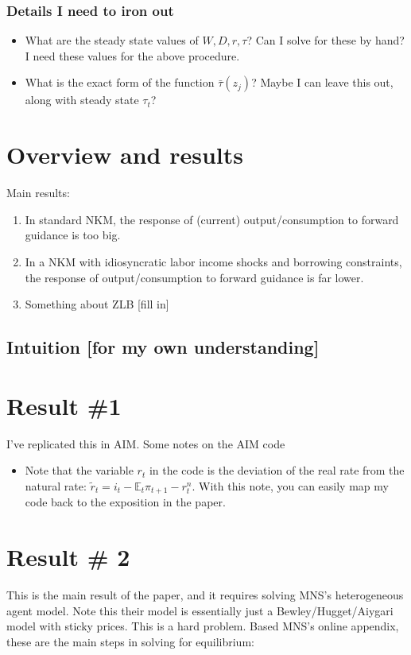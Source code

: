 \documentclass[12pt]{article}
\newcommand{\E}{\mathbb{E}}
\begin{document}
\subsubsection{Details I need to iron out}
\begin{itemize}
\item What are the steady state values of $W, D, r, \tau$? Can I solve for these by hand? I need these values for the above procedure.
\item What is the exact form of the function $\bar \tau(z_j)$? Maybe I can leave this out, along with steady state $\tau_t$?
\end{itemize}




\newpage

\section{Overview and results}
Main results:
\begin{enumerate}
\item In standard NKM, the response of (current) output/consumption to forward guidance is too big.
\item In a NKM with idiosyncratic labor income shocks and borrowing constraints, the response of output/consumption to forward guidance is far lower.
\item Something about ZLB [fill in]
\end{enumerate}

\subsection{Intuition [for my own understanding]}

\section{Result \#1}
I've replicated this in AIM. Some notes on the AIM code
\begin{itemize}
\item Note that the variable $r_t$ in the code is the deviation of the real rate from the natural rate: $\tilde r_t = i_t -\E_t\pi_{t+1} - r^n_t$. With this note, you can easily map my code back to the exposition in the paper.
\end{itemize}

\section{Result \# 2}
This is the main result of the paper, and it requires solving MNS's heterogeneous agent model. Note this their model is essentially just a Bewley/Hugget/Aiygari model with sticky prices. This is a hard problem. Based MNS's online appendix, these are the main steps in solving for equilibrium:
\end{document}
